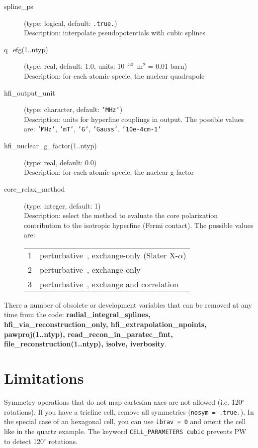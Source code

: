 \documentclass[a4paper,11pt,twoside]{article}
\begin{document}
\begin{description}
\item[spline\_ps] (type: logical, default: \texttt{.true.})\\
Description: interpolate pseudopotentials with cubic splines

\item[q\_efg(1..ntyp)] (type: real, default: 1.0, units: 10$^{-30}$~m$^2$ = 0.01 barn)\\
Description: for each atomic specie, the nuclear quadrupole

\item[hfi\_output\_unit] (type: character, default: \texttt{'MHz'})\\
Description: units for hyperfine couplings in output. The possible values are: 
\texttt{'MHz'}, \texttt{'mT'}, \texttt{'G'}, \texttt{'Gauss'}, \texttt{'10e-4cm-1'}

\item[hfi\_nuclear\_g\_factor(1..ntyp)] (type: real, default: 0.0)\\
Description: for each atomic specie, the nuclear g-factor

\item[core\_relax\_method] (type: integer, default: 1)\\
Description: select the method to evaluate the core polarization contribution
to the isotropic hyperfine (Fermi contact). The possible values are:\\
\begin{tabular}{ll}
  1 & perturbative~\cite{bahramy07}, exchange-only (Slater X-$\alpha$)\\
  2 & perturbative~\cite{bahramy07}, exchange-only\\
  3 & perturbative~\cite{bahramy07}, exchange and correlation\\
\end{tabular}

\end{description}
There a number of obsolete or development variables that can be removed at any
time from the code: \textbf{radial\_integral\_splines,
hfi\_via\_reconstruction\_only, hfi\_extrapolation\_npoints, pawproj(1..ntyp),
read\_recon\_in\_paratec\_fmt, file\_reconstruction(1..ntyp), isolve, iverbosity}.


\section{Limitations}
Symmetry operations that do not map cartesian axes are not allowed
(i.e. 120$^\circ$ rotations). If you have a triclinc cell, remove all
symmetries (\texttt{nosym = .true.}). In the special case of an hexagonal
cell, you can use \texttt{ibrav = 0} and orient the cell like in the
quartz example. The keyword \texttt{CELL\_PARAMETERS cubic} prevents PW
to detect 120$^\circ$ rotations.
\end{document}
